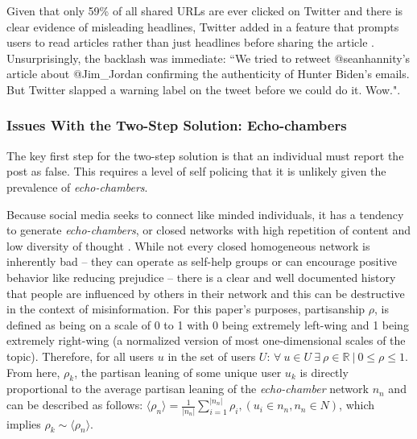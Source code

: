 \documentclass[preprint,review,12pt]{elsarticle}
\begin{document}
Given that only 59\% of all shared URLs are ever clicked on Twitter \cite{gabielkov2016social} and there is clear evidence of misleading headlines, Twitter added in a feature that prompts users to read articles rather than just headlines before sharing the article \cite{reuters2020article}. Unsurprisingly, the backlash was immediate: ``We tried to retweet @seanhannity’s article about @Jim\_Jordan confirming the authenticity of Hunter Biden’s emails. But Twitter slapped a warning label on the tweet before we could do it. Wow."\cite{judiciarytweet2020}.

\subsubsection{Issues With the Two-Step Solution: Echo-chambers}
\label{sec: echo-chambers}
 The key first step for the two-step solution is that an individual must report the post as false. This requires a level of self policing that it is unlikely given the prevalence of \textit{echo-chambers}. 
 
Because social media seeks to connect like minded individuals, it has a tendency to generate \textit{echo-chambers}, or closed networks with high repetition of content and low diversity of thought \cite{adibi2005proceedings, bastian2009international, pariser2011filter,bozdag2015breaking}. While not every closed homogeneous network is inherently bad -- they can operate as self-help groups \cite{kast2012under} or can encourage positive behavior like reducing prejudice \cite{paluck2011peer} -- there is a clear and well documented history that people are influenced by others in their network \cite{cialdini2004social,bollinger2012peer, bond201261,gerber2008social,gerber2009descriptive,meer2011brother,paluck2012salience,del2016spreading,bessi2015viral,friedkin1984structural,marsden1993network} and this can be destructive in the context of misinformation. For this paper's purposes, partisanship $\rho$, is defined as being on a scale of 0 to 1 with 0 being extremely left-wing and 1 being extremely right-wing (a normalized version of most one-dimensional scales of the topic). Therefore, for all users $u$ in the set of users $U$: $\forall \ u \in U \ \exists \ \rho \in \mathbb{R} \ | \ 0 \leq \rho \leq 1$.
From here, $\rho_k$, the partisan leaning of some unique user $u_k$ is directly proportional to the average partisan leaning of the \textit{echo-chamber} network $n_n$ and can be described as follows: $\langle \rho_n \rangle = \frac{1}{|n_n|}\sum_{i=1}^{|n_n|}{\rho_i}, (u_i \in n_n, n_n \in N)$, which implies $\rho_k \sim \langle \rho_n \rangle$.
 
\end{document}
